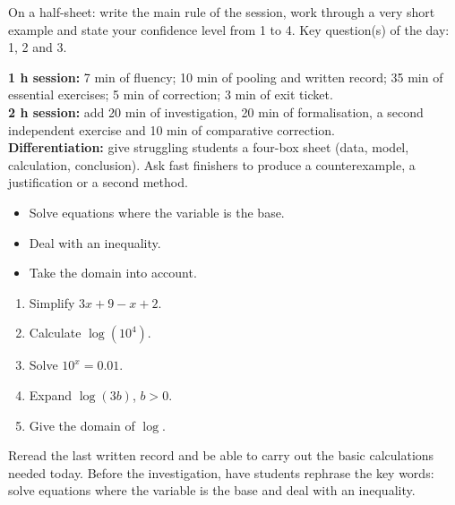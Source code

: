 \begin{exitticket}[3 minutes]On a half-sheet: write the main rule of the session, work through a very short example and state your confidence level from 1 to 4. Key question(s) of the day: 1, 2 and 3.\end{exitticket}

\ifmxteacher
\begin{method}
\textbf{1 h session:} 7 min of fluency; 10 min of pooling and written record; 35 min of essential exercises; 5 min of correction; 3 min of exit ticket.\\
\textbf{2 h session:} add 20 min of investigation, 20 min of formalisation, a second independent exercise and 10 min of comparative correction.\\
\textbf{Differentiation:} give struggling students a four-box sheet (data, model, calculation, conclusion). Ask fast finishers to produce a counterexample, a justification or a second method.
\end{method}
\fi
{}
\begin{objectives}\begin{itemize}\item Solve equations where the variable is the base.\item Deal with an inequality.\item Take the domain into account.\end{itemize}\end{objectives}
\begin{fluency}\begin{enumerate}\item Simplify $3x+9-x+2$. \item Calculate $\log(10^4)$. \item Solve $10^x=\num{0,01}$. \item Expand $\log(3b)$, $b>0$. \item Give the domain of $\log$. \mxblank{$]0,+\infty[$}\end{enumerate}\end{fluency}
\begin{prerequisites}Reread the last written record and be able to carry out the basic calculations needed today. Before the investigation, have students rephrase the key words: solve equations where the variable is the base and deal with an inequality.\end{prerequisites}

